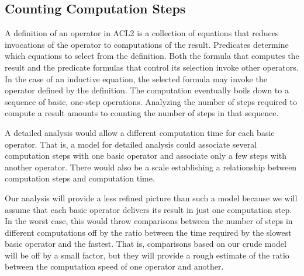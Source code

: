 \subsection{Counting Computation Steps}
\label{subsec:counting-computation-steps}

A definition of an operator in ACL2
is a collection of equations that
reduces invocations of the operator
to computations of the result.
Predicates determine
which equations to select from the definition.
Both the formula that computes the result and
the predicate formulas that control
its selection invoke other operators.
In the case of an inductive equation,
the selected formula may invoke the operator
defined by the definition.
The computation eventually boils down to a sequence of basic,
one-step operations.
Analyzing the number of steps required to compute a result
amounts to counting the number of steps in that sequence.

A detailed analysis would allow a different
computation time for each basic operator.
That is, a model for detailed analysis could associate
several computation steps with one basic operator
and associate only a few steps with another operator.
There would also be a scale establishing a relationship between
computation steps and computation time.

Our analysis will provide a less refined picture than such
a model because we will assume that each basic operator
delivers its result in just one computation step.
In the worst case, this would throw comparisons between
the number of steps in different computations off
by the ratio between the time required by the slowest basic
operator and the fastest. That is, comparisons
based on our crude model
will be off by a small factor,
but they will provide a
rough estimate of the ratio between the computation speed of
one operator and another.

